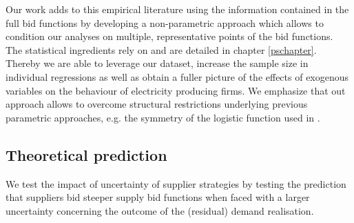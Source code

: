 Our work adds to this empirical literature using the information contained in the full bid functions 
by developing a non-parametric approach which allows to condition our analyses on multiple, representative points of the bid functions. The statistical ingredients rely on \cite{ramsaysilverman2005functional} and are detailed in chapter \ref{pschapter}.
Thereby we are able to leverage our dataset, increase the sample size in individual regressions as well as obtain a fuller picture of the effects of exogenous variables on the behaviour of electricity producing firms. We emphasize that out approach allows to overcome structural restrictions underlying previous parametric approaches, e.g. the symmetry of the logistic function used in \cite{pw2002etude}.



\subsection{Theoretical prediction}
\label{intropredict}


We test the impact of uncertainty of supplier strategies by testing the prediction that suppliers bid steeper supply bid functions when faced with a larger uncertainty concerning the outcome of the (residual) demand realisation.\\

